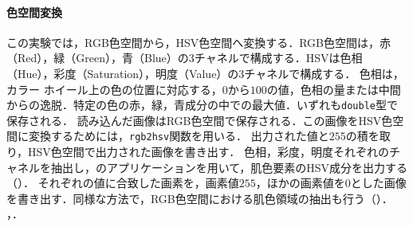 \paragraph{色空間変換}
この実験では，RGB色空間から，HSV色空間へ変換する．RGB色空間は，赤（Red），緑（Green），青（Blue）の3チャネルで構成する．HSVは色相（Hue），彩度（Saturation），明度（Value）の3チャネルで構成する．
色相は，カラー ホイール上の色の位置に対応する，\(0\)から\(100\)の値，色相の量または中間からの逸脱．特定の色の赤，緑，青成分の中での最大値．いずれも\texttt{double}型で保存される\cite{rgb2hsv}．
読み込んだ画像はRGB色空間で保存される．この画像をHSV色空間に変換するためには，\texttt{rgb2hsv}関数を用いる．
出力された値と\(255\)の積を取り，HSV色空間で出力された画像を書き出す．
色相，彩度，明度それぞれのチャネルを抽出し，\matlab のアプリケーションを用いて，肌色要素のHSV成分を出力する（）．
それぞれの値に合致した画素を，画素値\(255\)，ほかの画素値を\(0\)とした画像を書き出す．同様な方法で，RGB色空間における肌色領域の抽出も行う（）．
\scall{\kadaibe}，．
